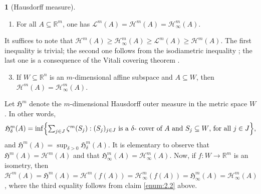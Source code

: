 \documentclass[11pt]{article}
\newcounter{cdrthm}[section]
\theoremstyle{definition}
\theoremstyle{jepanonymous}
\newtheorem{jepempty}[cdrthm]{}
\newenvironment{enonce}[2][remark]{\begin{jepempty}[#2]}{\end{jepempty}}
\theoremstyle{plain}
\newenvironment{Empty}[2][\null]{%
\begin{enonce}[remark]{#1}#2}
{\end{enonce}}
\newcommand{\R}{\mathbb{R}}
\newcommand{\Rm}{\R^m}
\newcommand{\Rn}{\R^n}
\newcommand{\calH}{\mathscr{H}}
\newcommand{\calL}{\mathscr{L}}
\newcommand{\frH}{\mathfrak{H}}
\let\subset\subseteq
\begin{document}
\begin{Empty}[Hausdorff measure]
{\begin{enumerate}
\item\label{enum:2.2} For all $A \subset \Rm$, one has $\calL^m(A) = \calH^m(A) = \calH^m_\infty(A)$.
\end{enumerate}
}
\par
It suffices to note that $\calH^m(A) \geq \calH^m_\infty(A) \geq \calL^m(A) \geq \calH^m(A)$.
The first inequality is trivial; the second one follows from the isodiametric inequality \cite[2.10.33]{GMT}; the last one is a consequence of the Vitali covering theorem \cite[Chap.\,2, \S 2, Th.\,2]{EVANS.GARIEPY}.
\par
{\it
\begin{enumerate}\setcounter{enumi}{2}
\item\label{enum:2.3} If $W \subset \Rn$ is an $m$-dimensional affine subspace and $A \subset W$, then $\calH^m(A) = \calH^m_\infty(A)$.
\end{enumerate}
}
\par
Let $\frH^m$ denote the $m$-dimensional Hausdorff outer measure in the metric space $W$.
In other words,
\begin{equation*}\textstyle
\frH^m_\delta(A) = \inf \Bigl\{ \sum_{j \in J} \zeta^m(S_j): (S_j)_{j \in J} \text{ is a $\delta$- cover of $A$ and $S_j \subset W$, for all $j \in J$}\Bigr\},
\end{equation*}
and $\frH^m(A) = \sup_{\delta > 0} \frH^m_\delta(A)$.
It is elementary to observe that $\frH^m(A) = \calH^m(A)$ and that $\frH^m_\infty(A) = \calH^m_\infty(A)$.
Now, if $f: W \to \Rm$ is an isometry, then $\calH^m(A) = \frH^m(A) = \calH^m(f(A)) = \calH^m_\infty(f(A)) = \frH^m_\infty(A) = \calH^m_\infty(A)$, where the third equality follows from claim \eqref{enum:2.2} above.
\end{Empty}
\end{document}
